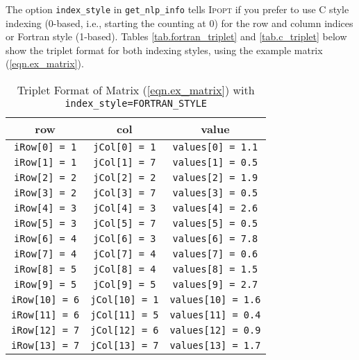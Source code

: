 \documentclass[10pt]{article}
\newcommand{\Ipopt}{\textsc{Ipopt}\xspace}
\begin{document}
The option {\tt index\_style} in {\tt get\_nlp\_info} tells \Ipopt if
you prefer to use C style indexing (0-based, i.e., starting the
counting at 0) for the row and column indices or Fortran style
(1-based). Tables \ref{tab.fortran_triplet} and \ref{tab.c_triplet}
below show the triplet format for both indexing styles, using the
example matrix (\ref{eqn.ex_matrix}).

\begin{footnotesize}
\begin{table}[ht]%
\begin{center}
\begin{tabular}{c c c}
row     		&       col     	&       value 			    \\
\hline
{\tt iRow[0] = 1}       &       {\tt jCol[0] = 1}       & {\tt values[0] = 1.1}     \\
{\tt iRow[1] = 1}       &       {\tt jCol[1] = 7}       & {\tt values[1] = 0.5}     \\
{\tt iRow[2] = 2}       &       {\tt jCol[2] = 2}       & {\tt values[2] = 1.9}     \\
{\tt iRow[3] = 2}       &       {\tt jCol[3] = 7}       & {\tt values[3] = 0.5}     \\
{\tt iRow[4] = 3}       &       {\tt jCol[4] = 3}       & {\tt values[4] = 2.6}     \\
{\tt iRow[5] = 3}       &       {\tt jCol[5] = 7}       & {\tt values[5] = 0.5}     \\
{\tt iRow[6] = 4}       &       {\tt jCol[6] = 3}       & {\tt values[6] = 7.8}     \\
{\tt iRow[7] = 4}       &       {\tt jCol[7] = 4}       & {\tt values[7] = 0.6}     \\
{\tt iRow[8] = 5}       &       {\tt jCol[8] = 4}       & {\tt values[8] = 1.5}     \\
{\tt iRow[9] = 5}       &       {\tt jCol[9] = 5}       & {\tt values[9] = 2.7}     \\
{\tt iRow[10] = 6}      &       {\tt jCol[10] = 1}      & {\tt values[10] = 1.6}     \\
{\tt iRow[11] = 6}      &       {\tt jCol[11] = 5}      & {\tt values[11] = 0.4}     \\
{\tt iRow[12] = 7}      &       {\tt jCol[12] = 6}      & {\tt values[12] = 0.9}     \\
{\tt iRow[13] = 7}      &       {\tt jCol[13] = 7}      & {\tt values[13] = 1.7}
\end{tabular}
\caption{Triplet Format of Matrix (\ref{eqn.ex_matrix}) 
with {\tt index\_style=FORTRAN\_STYLE}}

\end{center}
\end{table}
\end{footnotesize}
\end{document}

